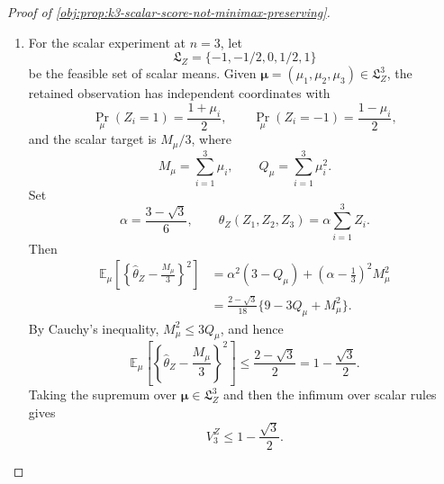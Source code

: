 \documentclass[11pt]{article}
\begin{document}
\begin{proof}[Proof of \cref{obj:prop:k3-scalar-score-not-minimax-preserving}]
\begin{enumerate}
\item
For the scalar experiment at \(n=3\), let
\[
\mathfrak L_Z=\{-1,-1/2,0,1/2,1\}
\]
be the feasible set of scalar means. Given \(\boldsymbol\mu=(\mu_1,\mu_2,\mu_3)\in\mathfrak L_Z^3\), the retained observation has independent coordinates with
\[
\Pr_\mu(Z_i=1)=\frac{1+\mu_i}{2},
\qquad
\Pr_\mu(Z_i=-1)=\frac{1-\mu_i}{2},
\]
and the scalar target is \(M_\mu/3\), where
\[
M_\mu=\sum_{i=1}^3\mu_i,
\qquad
Q_\mu=\sum_{i=1}^3\mu_i^2 .
\]
Set
\[
\alpha=\frac{3-\sqrt3}{6},
\qquad
\widehat\theta_Z(Z_1,Z_2,Z_3)=\alpha\sum_{i=1}^3 Z_i .
\]
Then
\[
\begin{aligned}
\mathbb E_\mu\!\left[
\left\{\widehat\theta_Z-\frac{M_\mu}{3}\right\}^2\right]
&=\alpha^2(3-Q_\mu)+\left(\alpha-\frac13\right)^2M_\mu^2  \\
&=\frac{2-\sqrt3}{18}\{9-3Q_\mu+M_\mu^2\}.
\end{aligned}
\]
By Cauchy's inequality, \(M_\mu^2\le3Q_\mu\), and hence
\[
\mathbb E_\mu\!\left[
\left\{\widehat\theta_Z-\frac{M_\mu}{3}\right\}^2\right]
\le \frac{2-\sqrt3}{2}
=1-\frac{\sqrt3}{2}.
\]
Taking the supremum over \(\boldsymbol\mu\in\mathfrak L_Z^3\) and then the infimum over scalar rules gives
\[
V_3^Z\le 1-\frac{\sqrt3}{2}.
\]


\end{enumerate}
\end{proof}
\end{document}
